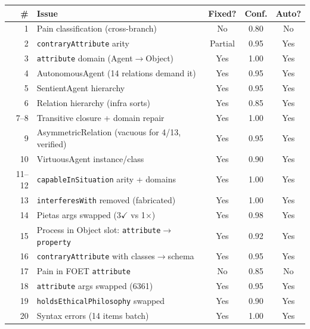 \documentclass[11pt]{article}
\theoremstyle{definition}
\theoremstyle{plain}
\begin{document}
\begin{center}
\small
\begin{tabular}{@{}rlccc@{}}
\toprule
\textbf{\#} & \textbf{Issue} & \textbf{Fixed?} & \textbf{Conf.}
  & \textbf{Auto?} \\
\midrule
 1 & Pain classification (cross-branch) & No & 0.80 & No \\
 2 & \texttt{contraryAttribute} arity & Partial & 0.95 & Yes \\
 3 & \texttt{attribute} domain (Agent$\to$Object) & Yes & 1.00 & Yes \\
 4 & AutonomousAgent (14 relations demand it) & Yes & 0.95 & Yes \\
 5 & SentientAgent hierarchy & Yes & 0.95 & Yes \\
 6 & Relation hierarchy (infra sorts) & Yes & 0.85 & Yes \\
 7--8 & Transitive closure + domain repair & Yes & 1.00 & Yes \\
 9 & AsymmetricRelation (vacuous for 4/13, verified) & Yes & 0.95 & Yes \\
10 & VirtuousAgent instance/class & Yes & 0.90 & Yes \\
11--12 & \texttt{capableInSituation} arity + domains & Yes & 1.00 & Yes \\
13 & \texttt{interferesWith} removed (fabricated) & Yes & 1.00 & Yes \\
14 & Pietas args swapped (3$\checkmark$ vs 1$\times$) & Yes & 0.98 & Yes \\
15 & Process in Object slot: \texttt{attribute}$\to$\texttt{property} & Yes & 0.92 & Yes \\
16 & \texttt{contraryAttribute} with classes$\to$schema & Yes & 0.95 & Yes \\
17 & Pain in FOET \texttt{attribute} & No & 0.85 & No \\
18 & \texttt{attribute} args swapped (6361) & Yes & 0.95 & Yes \\
19 & \texttt{holdsEthicalPhilosophy} swapped & Yes & 0.90 & Yes \\
20 & Syntax errors (14 items batch) & Yes & 1.00 & Yes \\
\bottomrule
\end{tabular}
\end{center}
\end{document}
